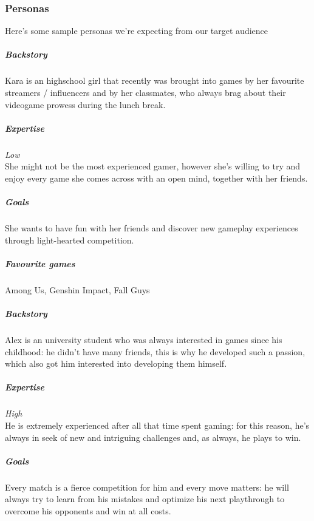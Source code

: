 \subsubsection{Personas}
Here's some sample personas we're expecting from our target audience 



\subparagraph{Backstory}
Kara is an highschool girl that recently was brought into games by her favourite streamers / influencers and by her classmates, who always brag about their videogame prowess during the lunch break.

\subparagraph{Expertise}
\textit{Low} \\
She might not be the most experienced gamer, however she's willing to try and enjoy every game she comes across with an open mind, together with her friends.

\subparagraph{Goals}
She wants to have fun with her friends and discover new gameplay experiences through light-hearted competition.

\subparagraph{Favourite games}
Among Us, Genshin Impact, Fall Guys 

\vspace{5mm}




\subparagraph{Backstory}
Alex is an university student who was always interested in games since his childhood: he didn't have many friends, this is why he developed such a passion, which also got him interested into developing them himself.

\subparagraph{Expertise}
\textit{High} \\ 
He is extremely experienced after all that time spent gaming: for this reason, he's always in seek of new and intriguing challenges and, as always, he plays to win.

\subparagraph{Goals}
Every match is a fierce competition for him and every move matters: he will always try to learn from his mistakes and optimize his next playthrough to overcome his opponents and win at all costs.


